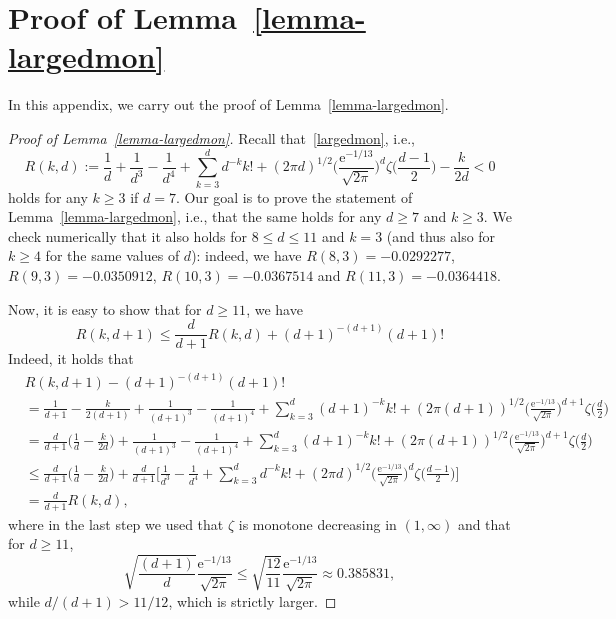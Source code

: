 \documentclass[oneside]{amsart}
\newcommand{\e}{\mathrm e}
\theoremstyle{definition}
\newcommand{\1}{\mathbbm{1}}
\newcommand{\0}{\mathbf{o}}
\numberwithin{equation}{section}
\begin{document}
\section{Proof of Lemma~\ref{lemma-largedmon}}\label{sec:largedmon}
In this appendix, we carry out the proof of Lemma~\ref{lemma-largedmon}.
\begin{proof}[Proof of Lemma~\ref{lemma-largedmon}]
Recall that~\eqref{largedmon}, i.e.,
\[ R(k,d):=\frac{1}{d} + \frac{1}{d^3} -\frac{1}{d^4} + \sum_{k=3}^d d^{-k} k! +  (2\pi d)^{1/2} \Big( \frac{\e^{-1/13}}{\sqrt{2\pi}} \Big)^d \zeta\Big( \frac{d-1}{2} \Big) - \frac{k}{2d} < 0  \]
holds for any $k\geq 3$ if $d=7$. 
Our goal is to prove the statement of Lemma~\ref{lemma-largedmon}, i.e., that the same holds for any $d \geq 7$ and $k\geq 3$. We check numerically that it also holds for $8 \leq d \leq 11$ and $k=3$ (and thus also for $k\geq 4$ for the same values of $d$): indeed, we have $R(8,3)=-0.0292277$, $R(9,3)=-0.0350912$, $R(10,3)=-0.0367514$ and $R(11,3)=-0.0364418$. 

Now, it is easy to show that for $d \geq 11$, we have
\begin{equation}\label{Rfactor} R(k,d+1) \leq \frac{d}{d+1} R(k,d) + (d+1)^{-(d+1)} (d+1)! \end{equation}
Indeed, it holds that
\[ 
\begin{aligned}
   & R(k,d+1)-(d+1)^{-(d+1)}(d+1)! \\ &=\frac{1}{d+1}- \frac{k}{2(d+1)} + \frac{1}{(d+1)^3} -\frac{1}{(d+1)^4} + \sum_{k=3}^{d} (d+1)^{-k} k! +  (2\pi (d+1))^{1/2} \Big( \frac{\e^{-1/13}}{\sqrt{2\pi}} \Big)^{d+1} \zeta\Big( \frac{d}{2} \Big)
\\    &=\frac{d}{d+1} \Big( \frac{1}{d}- \frac{k}{2d} \Big) + \frac{1}{(d+1)^3} -\frac{1}{(d+1)^4} + \sum_{k=3}^{d} (d+1)^{-k} k! +  (2\pi (d+1))^{1/2} \Big( \frac{\e^{-1/13}}{\sqrt{2\pi}} \Big)^{d+1} \zeta\Big( \frac{d}{2} \Big)
\\ & \leq \frac{d}{d+1} \Big( \frac{1}{d}- \frac{k}{2d} \Big) + \frac{d}{d+1} \bigg[ \frac{1}{d^3} -\frac{1}{d^4} + \sum_{k=3}^d d^{-k} k! +  (2\pi d)^{1/2} \Big( \frac{\e^{-1/13}}{\sqrt{2\pi}} \Big)^d \zeta\Big( \frac{d-1}{2} \Big) \bigg] \\ &=\frac{d}{d+1} R(k,d),
\end{aligned}  \]
where in the last step we used that $\zeta$ is monotone decreasing in $(1,\infty)$ and that for $d \geq 11$,
\begin{equation*} \sqrt{\frac{(d+1)}{ d}} \frac{\e^{-1/13}}{\sqrt{2\pi}} \leq \sqrt{\frac{12}{11}} \frac{\e^{-1/13}}{\sqrt{2\pi}}  \approx 0.385831, \end{equation*}
while $d/(d+1)>11/12$, which is strictly larger. 


\end{proof}
\end{document}
